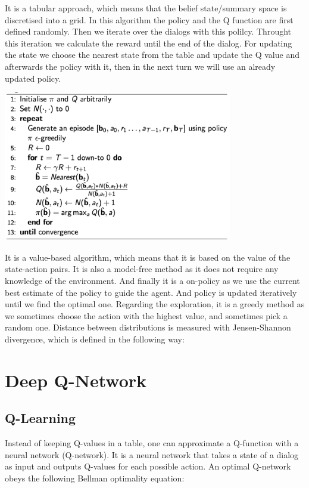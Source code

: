 \documentclass[12pt,titlepage,a4paper]{article}
\begin{document}
It is a tabular approach, which means that the belief state/summary space is discretised into a grid. In this algorithm the policy and the Q function are first defined randomly. Then we iterate over the dialogs with this polilcy. Throught this iteration we calculate the reward until the end of the dialog. For updating the state we choose the nearest state from the table and update the Q value and afterwards the policy with it, then in the next turn we will use an already updated policy. 

\begin{center}
    \includegraphics[width=10cm]{MCC.png}
\end{center}
It is a value-based algorithm, which means that it is based on the value of the state-action pairs. It is also a model-free method as it does not require any knowledge of the environment. And finally it is a on-policy as we use the current best estimate of the policy to guide the agent. And policy is updated iteratively until we find the optimal one. Regarding the exploration, it is a greedy method as we sometimes choose the action with the highest value, and sometimes pick a random one. Distance between distributions is measured with Jensen-Shannon divergence, which is defined in the following way:


\pagebreak


\section{Deep Q-Network}

\subsection{Q-Learning}
Instead of keeping Q-values in a table, one can approximate a Q-function with a neural network (Q-network). It is a neural network that takes a state of a dialog as input and outputs Q-values for each possible action. An optimal Q-network obeys the following Bellman optimality equation: 
\end{document}
